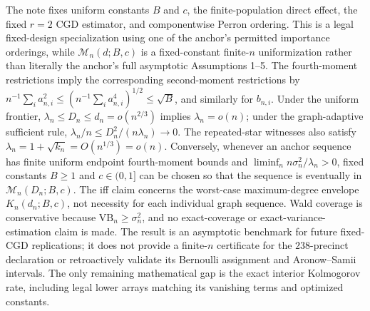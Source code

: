 \documentclass{article}
\begin{document}
The note fixes uniform constants \(B\) and \(c\), the finite-population direct effect, the fixed \(r=2\) CGD estimator, and componentwise Perron ordering. This is a legal fixed-design specialization using one of the anchor's permitted importance orderings, while \(\mathcal M_n(d;B,c)\) is a fixed-constant finite-\(n\) uniformization rather than literally the anchor's full asymptotic Assumptions 1--5. The fourth-moment restrictions imply the corresponding second-moment restrictions by \(n^{-1}\sum_i a_{n,i}^2\le(n^{-1}\sum_i a_{n,i}^4)^{1/2}\le\sqrt B\), and similarly for \(b_{n,i}\). Under the uniform frontier, \(\lambda_n\le D_n\le d_n=o(n^{2/3})\) implies \(\lambda_n=o(n)\); under the graph-adaptive sufficient rule, \(\lambda_n/n\le D_n^2/(n\lambda_n)\to0\). The repeated-star witnesses also satisfy \(\lambda_n=1+\sqrt{k_n}=O(n^{1/3})=o(n)\). Conversely, whenever an anchor sequence has finite uniform endpoint fourth-moment bounds and \(\liminf_n n\sigma_n^2/\lambda_n>0\), fixed constants \(B\ge1\) and \(c\in(0,1]\) can be chosen so that the sequence is eventually in \(\mathcal M_n(D_n;B,c)\). The iff claim concerns the worst-case maximum-degree envelope \(K_n(d_n;B,c)\), not necessity for each individual graph sequence. Wald coverage is conservative because \(\mathrm{VB}_n\ge\sigma_n^2\), and no exact-coverage or exact-variance-estimation claim is made. The result is an asymptotic benchmark for future fixed-CGD replications; it does not provide a finite-\(n\) certificate for the \(238\)-precinct declaration or retroactively validate its Bernoulli assignment and Aronow--Samii intervals. The only remaining mathematical gap is the exact interior Kolmogorov rate, including legal lower arrays matching its vanishing terms and optimized constants.
\end{document}
